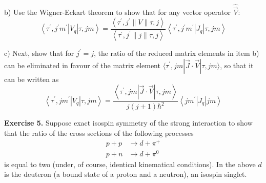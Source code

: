 \documentclass[12pt]{article}
\begin{document}
b) Use the Wigner-Eckart theorem to show that for any vector operator $\hat{\vec{V}}$:
\[
\left\langle\tau^{\prime}, j^{\prime} m^{\prime}\left|V_{q}\right| \tau, j m\right\rangle=\frac{\left\langle\tau^{\prime}, j^{\prime}\|V\| \tau, j\right\rangle}{\left\langle\tau^{\prime}, j^{\prime}\|j\| \tau, j\right\rangle}\left\langle\tau^{\prime}, j^{\prime} m^{\prime}\left|J_{q}\right| \tau, j m\right\rangle
\]

c) Next, show that for \(j^{\prime}=j\), the ratio of the reduced matrix elements in item b) can be
eliminated in favour of the matrix element \(\langle\tau^{\prime}, j m|\vec{J} \cdot \vec{V}| \tau, j m\rangle\), so that it can be written as
\[
\left\langle\tau^{\prime}, j m^{\prime}\left|V_{q}\right| \tau, j m\right\rangle=\frac{\left\langle\tau^{\prime}, j m|\vec{J} \cdot \vec{V}| \tau, j m\right\rangle}{j(j+1) \hbar^{2}}\left\langle j m^{\prime}\left|J_{q}\right| j m\right\rangle
\]


\textbf{Exercise 5.} Suppose exact isospin symmetry of the strong interaction to show that the ratio of
the cross sections of the following processes
\[
\begin{aligned}
p+p &\rightarrow d+\pi^{+}\\
p+n &\rightarrow d+\pi^{0}
\end{aligned}
\]
is equal to two (under, of course, identical kinematical conditions). In the above $d$ is the
deuteron (a bound state of a proton and a neutron), an isospin singlet.
\end{document}
